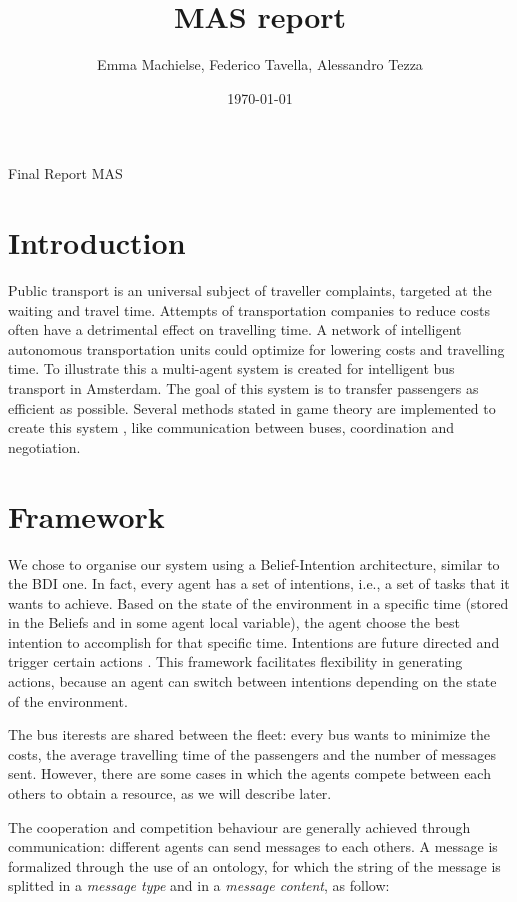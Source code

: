 \documentclass{article}
\title{MAS report}
\author{Emma Machielse, Federico Tavella, Alessandro Tezza}
\date{\today}
\begin{document}
\maketitle Final Report MAS


\section{Introduction}
Public transport is an universal subject of traveller complaints, targeted at the waiting and travel time. Attempts of transportation companies to reduce costs often have a detrimental effect on travelling time. A network of intelligent autonomous transportation units could optimize for lowering costs and travelling time. To illustrate this a multi-agent system is created for intelligent bus transport in Amsterdam. The goal of this system is to transfer passengers as efficient as possible. Several methods stated in game theory \cite{intromultiagentsystems} are implemented to create this system
, like communication between buses, coordination and negotiation. 

\section{Framework}
We chose to organise our system using a Belief-Intention architecture, similar to the BDI one\cite{caillou2017simple}. In fact, every agent has a set of intentions, i.e.,  a set of tasks that it wants to achieve. Based on the state of the environment in a specific time (stored in the Beliefs and in some agent local variable), the agent choose the best intention to accomplish for that specific time. Intentions are future directed and trigger certain actions \cite{multiagentsystems}. This framework facilitates flexibility in generating actions, because an agent can switch between intentions depending on the state of the environment. 

The bus iterests are shared between the fleet: every bus wants to minimize the costs, the average travelling time of the passengers and the number of messages sent. However, there are some cases in which the agents compete between each others to obtain a resource, as we will describe later.

The cooperation and competition behaviour are generally achieved through communication: different agents can send messages to each others. A message is formalized through the use of an ontology, for which the string of the message is splitted in a \textit{message type} and in a \textit{message content}, as follow:
\end{document}
